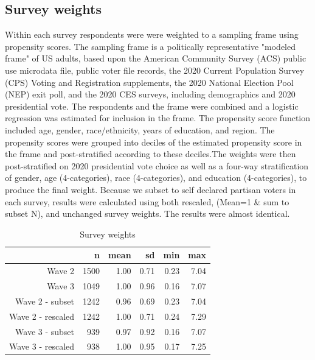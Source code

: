 \documentclass{article}\usepackage[]{graphicx}\usepackage[]{xcolor}
\begin{document}
\subsection{Survey weights}

Within each survey respondents were  were weighted to a sampling frame using propensity scores. The sampling
frame is a politically representative "modeled frame" of US adults, based upon the
American Community Survey (ACS) public use microdata file, public voter file
records, the 2020 Current Population Survey (CPS) Voting and Registration
supplements, the 2020 National Election Pool (NEP) exit poll, and the 2020 CES
surveys, including demographics and 2020 presidential vote. The respondents and the
frame were combined and a logistic regression was estimated for inclusion in the
frame. The propensity score function included age, gender, race/ethnicity, years of
education, and region. The propensity scores were grouped into deciles of the
estimated propensity score in the frame and post-stratified according to these
deciles.The weights were then post-stratified on 2020 presidential vote choice as well as a
four-way stratification of gender, age (4-categories), race (4-categories), and
education (4-categories), to produce the final weight. Because we 
subset to self declared partisan voters in each survey, results were  calculated using both rescaled, (Mean=1 \& sum to subset N), and unchanged survey weights. The results were almost identical. 

\begin{table}[H]
\centering
\normalsize
\caption{Survey weights}
\label{tab:survey_weights}
\begin{tabular}{rrrrrr}
  \hline
 & n & mean & sd & min & max \\ 
  \hline
Wave 2 & 1500 & 1.00 & 0.71 & 0.23 & 7.04 \\ 
  Wave 3 & 1049 & 1.00 & 0.96 & 0.16 & 7.07 \\ 
  Wave 2 - subset & 1242 & 0.96 & 0.69 & 0.23 & 7.04 \\ 
  Wave 2 - rescaled & 1242 & 1.00 & 0.71 & 0.24 & 7.29 \\ 
  Wave 3 - subset & 939 & 0.97 & 0.92 & 0.16 & 7.07 \\ 
  Wave 3 - rescaled & 938 & 1.00 & 0.95 & 0.17 & 7.25 \\ 
   \hline
\end{tabular}
\end{table}
\end{document}
